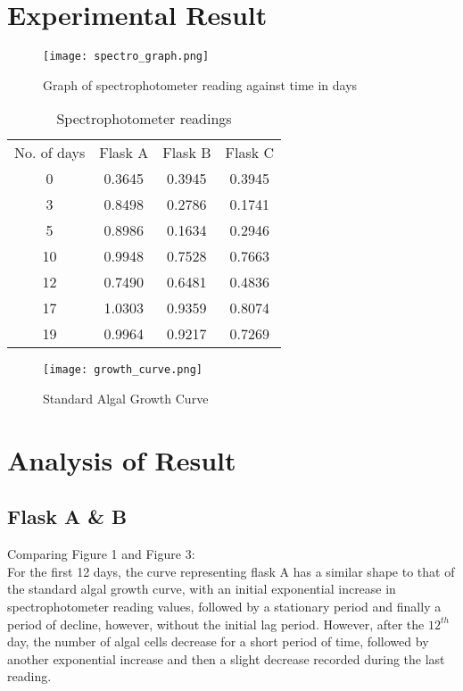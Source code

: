 \documentclass[12pt,a4paper]{IEEEtran}
\begin{document}
    \section{Experimental Result}
    \begin{figure}[H]
    	\begin{center}
    		\texttt{[image: spectro\_graph.png]}
    		\caption{Graph of spectrophotometer reading against time in days}
    		\label{fig:spectrograph}
    	\end{center}
    \end{figure} \vspace{-0.2in}
	\begin{table}[H]
		\centering
		\caption{Spectrophotometer readings}
		\label{tab:spectrotable}
		\small
		\begin{tabular}{|c|c|c|c|}
			No. of days & Flask A & Flask B & Flask C \\
			0           & 0.3645  & 0.3945  & 0.3945  \\
			3           & 0.8498  & 0.2786  & 0.1741  \\
			5           & 0.8986  & 0.1634  & 0.2946  \\
			10          & 0.9948  & 0.7528  & 0.7663  \\
			12          & 0.7490  & 0.6481  & 0.4836  \\
			17          & 1.0303  & 0.9359  & 0.8074  \\
			19          & 0.9964  & 0.9217  & 0.7269          
		\end{tabular}
		\normalsize
	\end{table}
	\begin{figure}[H]
		\begin{center}
			\texttt{[image: growth\_curve.png]}
			\caption{Standard Algal Growth Curve}
			\label{growthcurve}
		\end{center}
	\end{figure}
    \section{Analysis of Result}
    \subsection{Flask A \& B}
    Comparing Figure 1 and Figure 3: \\
    
    For the first 12 days, the curve representing flask A has a similar shape to that of the standard algal growth curve, with an initial exponential increase in spectrophotometer reading values, followed by a stationary period and finally a period of decline, however, without the initial lag period. However, after the $12^{th}$ day, the number of algal cells decrease for a short period of time, followed by another exponential increase and then a slight decrease recorded during the last reading. \\
    
\end{document}

